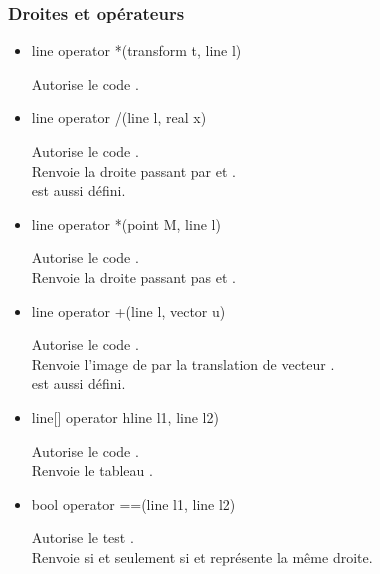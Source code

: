 \documentclass[pdftex]{article}
\newcommand{\ssi}{si et seulement si\xspace}
\begin{document}
\subsubsection{Droites et opérateurs}
\begin{itemize}
\item {}%
    \begin{Vcolor}
    line operator *(transform t, line l)
  \end{Vcolor}
  Autorise le code .
\item {}%
    \begin{Vcolor}
    line operator /(line l, real x)
  \end{Vcolor}
  Autorise le code .\\
  Renvoie la \og{}droite\fg{} passant par 
  et .\\
   est aussi défini.
\item {}%
    \begin{Vcolor}
    line operator *(point M, line l)
  \end{Vcolor}
  Autorise le code .\\
  Renvoie la \og{}droite\fg{} passant pas  et .
\item {}%
    \begin{Vcolor}
    line operator +(line l, vector u)
  \end{Vcolor}
  Autorise le code .\\
  Renvoie l'image de  par la translation de
  vecteur .\\
   est aussi défini.
\item {}%
    \begin{Vcolor}
    line[] operator ^^(line l1, line l2)
  \end{Vcolor}
  Autorise le code .\\
  Renvoie le tableau .
\item {}%
    \begin{Vcolor}
    bool operator ==(line l1, line l2)
  \end{Vcolor}
  Autorise le test .\\
  Renvoie  \ssi {} et  représente la même droite.

\end{itemize}
\end{document}
